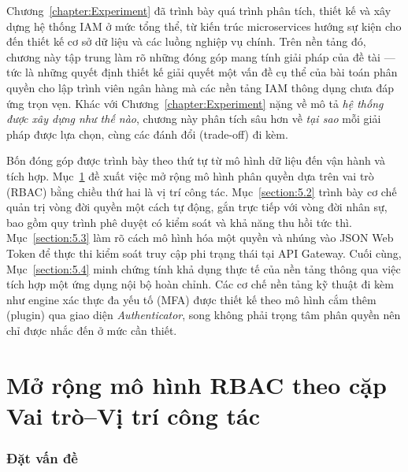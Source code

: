 \documentclass[../DoAn.tex]{subfiles}
\begin{document}
Chương~\ref{chapter:Experiment} đã trình bày quá trình phân tích, thiết kế và xây dựng hệ thống IAM ở mức tổng thể, từ kiến trúc microservices hướng sự kiện cho đến thiết kế cơ sở dữ liệu và các luồng nghiệp vụ chính. Trên nền tảng đó, chương này tập trung làm rõ những đóng góp mang tính giải pháp của đề tài --- tức là những quyết định thiết kế giải quyết một vấn đề cụ thể của bài toán phân quyền cho lập trình viên ngân hàng mà các nền tảng IAM thông dụng chưa đáp ứng trọn vẹn. Khác với Chương~\ref{chapter:Experiment} nặng về mô tả \textit{hệ thống được xây dựng như thế nào}, chương này phân tích sâu hơn về \textit{tại sao} mỗi giải pháp được lựa chọn, cùng các đánh đổi (trade-off) đi kèm.

Bốn đóng góp được trình bày theo thứ tự từ mô hình dữ liệu đến vận hành và tích hợp. Mục~\ref{section:5.1} đề xuất việc mở rộng mô hình phân quyền dựa trên vai trò (RBAC) bằng chiều thứ hai là vị trí công tác. Mục~\ref{section:5.2} trình bày cơ chế quản trị vòng đời quyền một cách tự động, gắn trực tiếp với vòng đời nhân sự, bao gồm quy trình phê duyệt có kiểm soát và khả năng thu hồi tức thì. Mục~\ref{section:5.3} làm rõ cách mô hình hóa một quyền và nhúng vào JSON Web Token để thực thi kiểm soát truy cập phi trạng thái tại API Gateway. Cuối cùng, Mục~\ref{section:5.4} minh chứng tính khả dụng thực tế của nền tảng thông qua việc tích hợp một ứng dụng nội bộ hoàn chỉnh. Các cơ chế nền tảng kỹ thuật đi kèm như engine xác thực đa yếu tố (MFA) được thiết kế theo mô hình cắm thêm (plugin) qua giao diện \textit{Authenticator}, song không phải trọng tâm phân quyền nên chỉ được nhắc đến ở mức cần thiết.

\section{Mở rộng mô hình RBAC theo cặp Vai trò--Vị trí công tác}
\label{section:5.1}

\subsubsection*{Đặt vấn đề}
\end{document}
